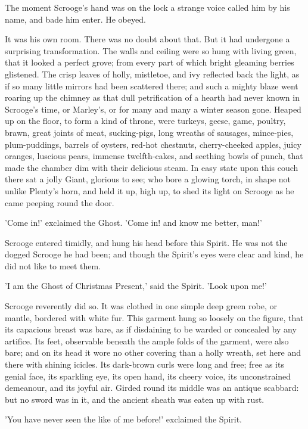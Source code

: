 The moment Scrooge's hand was on the lock a strange voice called him by
his name, and bade him enter. He obeyed.

It was his own room. There was no doubt about that. But it had undergone
a surprising transformation. The walls and ceiling were so hung with
living green, that it looked a perfect grove; from every part of which
bright gleaming berries glistened. The crisp leaves of holly, mistletoe,
and ivy reflected back the light, as if so many little mirrors had been
scattered there; and such a mighty blaze went roaring up the chimney as
that dull petrification of a hearth had never known in Scrooge's time,
or Marley's, or for many and many a winter season gone. Heaped up on the
floor, to form a kind of throne, were turkeys, geese, game, poultry,
brawn, great joints of meat, sucking-pigs, long wreaths of sausages,
mince-pies, plum-puddings, barrels of oysters, red-hot chestnuts,
cherry-cheeked apples, juicy oranges, luscious pears, immense
twelfth-cakes, and seething bowls of punch, that made the chamber dim
with their delicious steam. In easy state upon this couch there sat a
jolly Giant, glorious to see; who bore a glowing torch, in shape not
unlike Plenty's horn, and held it up, high up, to shed its light on
Scrooge as he came peeping round the door.

'Come in!' exclaimed the Ghost. 'Come in! and know me better, man!'

Scrooge entered timidly, and hung his head before this Spirit. He was
not the dogged Scrooge he had been; and though the Spirit's eyes were
clear and kind, he did not like to meet them.

'I am the Ghost of Christmas Present,' said the Spirit. 'Look upon me!'

Scrooge reverently did so. It was clothed in one simple deep green robe,
or mantle, bordered with white fur. This garment hung so loosely on the
figure, that its capacious breast was bare, as if disdaining to be
warded or concealed by any artifice. Its feet, observable beneath the
ample folds of the garment, were also bare; and on its head it wore no
other covering than a holly wreath, set here and there with shining
icicles. Its dark-brown curls were long and free; free as its genial
face, its sparkling eye, its open hand, its cheery voice, its
unconstrained demeanour, and its joyful air. Girded round its middle was
an antique scabbard: but no sword was in it, and the ancient sheath was
eaten up with rust.

'You have never seen the like of me before!' exclaimed the Spirit.

